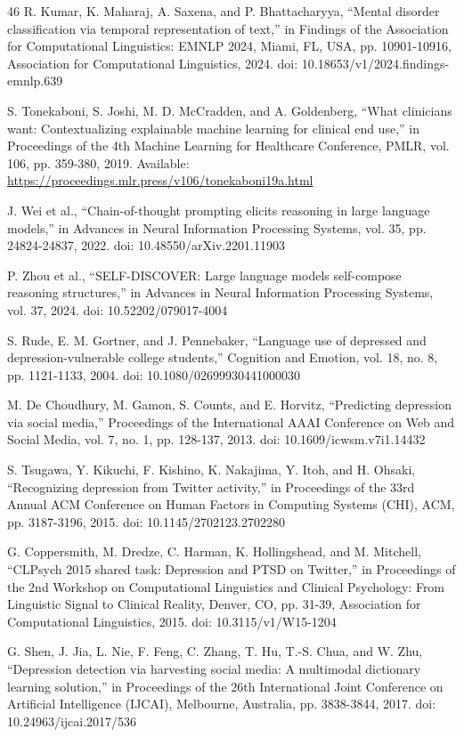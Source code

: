 \documentclass{ieeeaccess}
\begin{document}
\begin{thebibliography}{46}
 R. Kumar, K. Maharaj, A. Saxena, and P. Bhattacharyya, ``Mental disorder classification via temporal representation of text,'' in Findings of the Association for Computational Linguistics: EMNLP 2024, Miami, FL, USA, pp. 10901-10916, Association for Computational Linguistics, 2024. doi: 10.18653/v1/2024.findings-emnlp.639

 S. Tonekaboni, S. Joshi, M. D. McCradden, and A. Goldenberg, ``What clinicians want: Contextualizing explainable machine learning for clinical end use,'' in Proceedings of the 4th Machine Learning for Healthcare Conference, PMLR, vol. 106, pp. 359-380, 2019. Available: \url{https://proceedings.mlr.press/v106/tonekaboni19a.html}

 J. Wei et al., ``Chain-of-thought prompting elicits reasoning in large language models,'' in Advances in Neural Information Processing Systems, vol. 35, pp. 24824-24837, 2022. doi: 10.48550/arXiv.2201.11903

 P. Zhou et al., ``SELF-DISCOVER: Large language models self-compose reasoning structures,'' in Advances in Neural Information Processing Systems, vol. 37, 2024. doi: 10.52202/079017-4004

 S. Rude, E. M. Gortner, and J. Pennebaker, ``Language use of depressed and depression-vulnerable college students,'' Cognition and Emotion, vol. 18, no. 8, pp. 1121-1133, 2004. doi: 10.1080/02699930441000030

 M. De Choudhury, M. Gamon, S. Counts, and E. Horvitz, ``Predicting depression via social media,'' Proceedings of the International AAAI Conference on Web and Social Media, vol. 7, no. 1, pp. 128-137, 2013. doi: 10.1609/icwsm.v7i1.14432

 S. Tsugawa, Y. Kikuchi, F. Kishino, K. Nakajima, Y. Itoh, and H. Ohsaki, ``Recognizing depression from Twitter activity,'' in Proceedings of the 33rd Annual ACM Conference on Human Factors in Computing Systems (CHI), ACM, pp. 3187-3196, 2015. doi: 10.1145/2702123.2702280

 G. Coppersmith, M. Dredze, C. Harman, K. Hollingshead, and M. Mitchell, ``CLPsych 2015 shared task: Depression and PTSD on Twitter,'' in Proceedings of the 2nd Workshop on Computational Linguistics and Clinical Psychology: From Linguistic Signal to Clinical Reality, Denver, CO, pp. 31-39, Association for Computational Linguistics, 2015. doi: 10.3115/v1/W15-1204

 G. Shen, J. Jia, L. Nie, F. Feng, C. Zhang, T. Hu, T.-S. Chua, and W. Zhu, ``Depression detection via harvesting social media: A multimodal dictionary learning solution,'' in Proceedings of the 26th International Joint Conference on Artificial Intelligence (IJCAI), Melbourne, Australia, pp. 3838-3844, 2017. doi: 10.24963/ijcai.2017/536


\end{thebibliography}
\end{document}

